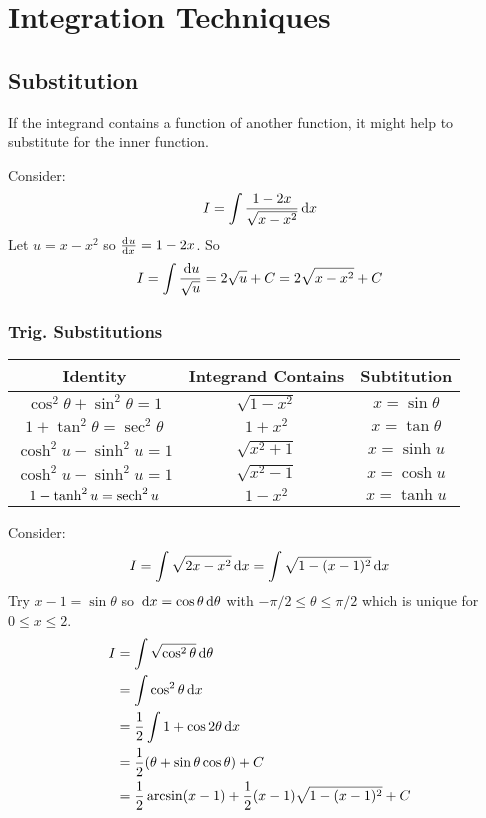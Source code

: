 \documentclass[../main.tex]{subfiles}
\begin{document}
\section{Integration Techniques}
\subsection{Substitution}
If the integrand contains a function of another function, it might help to substitute for the inner function.
\begin{example}
  Consider:
  \[
    I = \int \frac{1-2x}{\sqrt{x - x^2}} \,\mathrm{d} x
  \]
  Let $u = x - x^2$ so $\deriv{u}{x} = 1 - 2x$.
  So
  \[
    I = \int \frac{\,\mathrm{d} u}{\sqrt{u}} = 2\sqrt{u} + C = 2\sqrt{x - x^2} + C
  \]
\end{example}
\subsubsection{Trig. Substitutions}
\begin{center}
\begin{tabular}{c|c|c}
Identity & Integrand Contains & Subtitution \\
\hline
$\cos^2 \theta  + \sin^2 \theta = 1$ & $\sqrt{1-x^2}$ & $x = \sin\theta$ \\
$1 + \tan^2 \theta = \sec^2 \theta$ & $1 + x^2$ & $x = \tan \theta$ \\
$\cosh^2u - \sinh^2u = 1$ & $\sqrt{x^2 + 1}$ & $x = \sinh u$ \\
$\cosh^2u - \sinh^2u = 1$ & $\sqrt{x^2 - 1}$ & $x = \cosh u$ \\
$1-\tanh^2u = \operatorname{sech}^2u$ & $1-x^2$ & $x = \tanh u$
\end{tabular}
\end{center}
\begin{example}
  Consider:
  \[
    I = \int \sqrt{2x - x^2} \,\mathrm{d} x = \int \sqrt{1 - (x-1)^2} \,\mathrm{d} x \\
  \]
  Try $x - 1 = \sin \theta$ so $\,\mathrm{d} x = \cos\theta \,\mathrm{d} \theta$ with $-\pi/2 \leq \theta \leq \pi/2$ which is unique for $0 \leq x \leq 2$.
  \begin{align*}
    I &= \int \sqrt{\cos^2\theta} \,\mathrm{d} \theta \\
      &= \int \cos^2 \theta \,\mathrm{d} x \\
      &= \frac{1}{2} \int 1 + \cos 2\theta \,\mathrm{d} x \\
      &= \frac{1}{2}(\theta + \sin\theta \cos \theta) + C \\
      &= \frac{1}{2} \arcsin(x-1) + \frac{1}{2}(x-1)\sqrt{1 - (x-1)^2} + C
  \end{align*}
\end{example}
\end{document}
